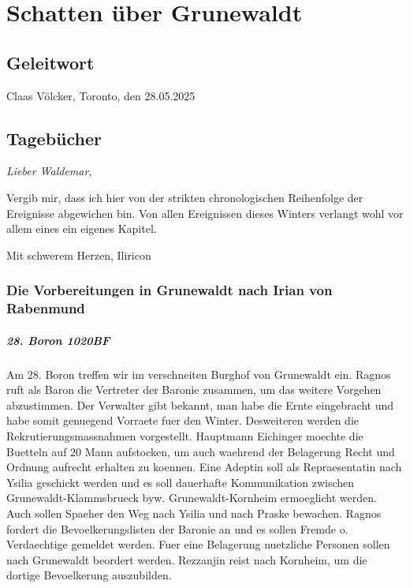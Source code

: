 \chapter{Schatten über Grunewaldt}

\section{Geleitwort}

\begin{flushright}
Claas Völcker, Toronto, den 28.05.2025
\end{flushright}

\section{Tagebücher}

{\itshape
Lieber Waldemar, 

Vergib mir, dass ich hier von der strikten chronologischen Reihenfolge der Ereignisse abgewichen bin. Von allen Ereignissen dieses Winters verlangt wohl vor allem eines ein eigenes Kapitel.

Mit schwerem Herzen, Iliricon
}

\subsection{Die Vorbereitungen in Grunewaldt nach Irian von Rabenmund}

\paragraph{28. Boron 1020BF}
Am 28. Boron treffen wir im verschneiten Burghof von Grunewaldt ein. Ragnos ruft als Baron die Vertreter der Baronie zusammen, um das weitere Vorgehen abzustimmen. Der Verwalter gibt bekannt, man habe die Ernte eingebracht und habe somit genuegend Vorraete fuer den Winter. Desweiteren werden die Rekrutierungsmassnahmen vorgestellt. Hauptmann Eichinger moechte die Buetteln auf 20 Mann aufstocken, um auch waehrend der Belagerung Recht und Ordnung aufrecht erhalten zu koennen. Eine Adeptin soll als Repraesentatin nach Ysilia geschickt werden und es soll dauerhafte Kommunikation zwischen Grunewaldt-Klammsbrueck byw. Grunewaldt-Kornheim ermoeglicht werden. Auch sollen Spaeher den Weg nach Ysilia und nach Praske bewachen. Ragnos fordert die Bevoelkerungslisten der Baronie an und es sollen Fremde o. Verdaechtige gemeldet werden. Fuer eine Belagerung nuetzliche Personen sollen nach Grunewaldt beordert werden. Rezzanjin reist nach Kornheim, um die dortige Bevoelkerung auszubilden.

